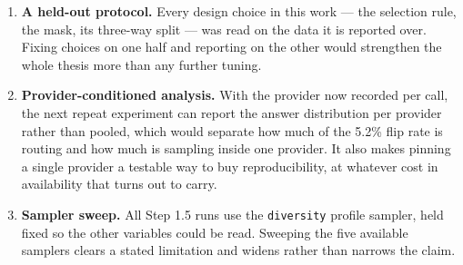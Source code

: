\documentclass[11pt]{article}
\begin{document}
\begin{enumerate}
\item \textbf{A held-out protocol.} Every design choice in this work --- the selection rule,
the mask, its three-way split --- was read on the data it is reported over. Fixing choices on
one half and reporting on the other would strengthen the whole thesis more than any further
tuning.
\item \textbf{Provider-conditioned analysis.} With the provider now recorded per call, the
next repeat experiment can report the answer distribution per provider rather than pooled,
which would separate how much of the 5.2\% flip rate is routing and how much is sampling
inside one provider. It also makes pinning a single provider a testable way to buy
reproducibility, at whatever cost in availability that turns out to carry.
\item \textbf{Sampler sweep.} All Step 1.5 runs use the \texttt{diversity} profile sampler,
held fixed so the other variables could be read. Sweeping the five available samplers clears
a stated limitation and widens rather than narrows the claim.
\end{enumerate}
\end{document}
